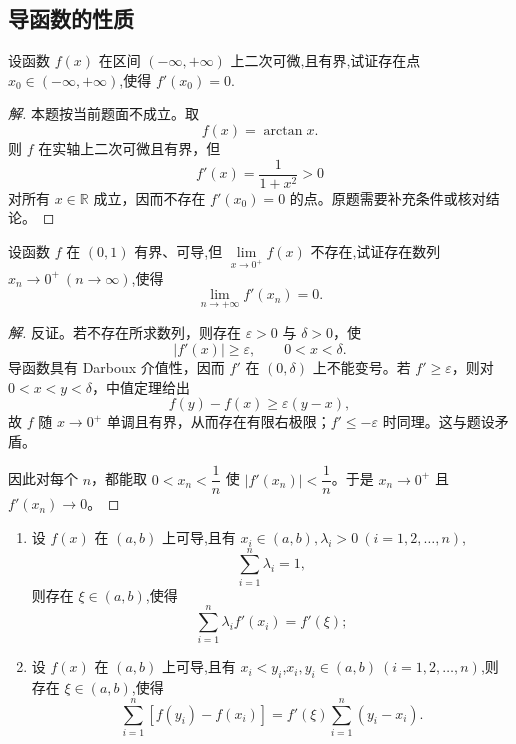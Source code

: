 \documentclass[../../数学分析培优讲义(答案版).tex]{subfiles}
\begin{document}
\subsection{导函数的性质}

\begin{example}
设函数 $f(x)$ 在区间 $(-\infty,+\infty)$ 上二次可微,且有界,试证存在点 $x_0\in(-\infty,+\infty)$,使得 $f'(x_0)=0$.
\end{example}

\begin{proof}[解]
本题按当前题面不成立。取
\[
    f(x)=\arctan x.
\]
则 $f$ 在实轴上二次可微且有界，但
\[
    f'(x)=\dfrac{1}{1+x^2}>0
\]
对所有 $x\in\mathbb{R}$ 成立，因而不存在 $f'(x_0)=0$ 的点。原题需要补充条件或核对结论。
\end{proof}

\begin{example}
设函数 $f$ 在 $(0,1)$ 有界、可导,但 $\displaystyle\lim\limits_{x\to0^+}f(x)$ 不存在,试证存在数列 $x_n\to0^+\ (n\to\infty)$,使得
\[
    \lim\limits_{n\to+\infty}f'(x_n)=0.
\]
\end{example}

\begin{proof}[解]
反证。若不存在所求数列，则存在 $\varepsilon>0$ 与 $\delta>0$，使
\[
    |f'(x)|\geq\varepsilon,
    \qquad 0<x<\delta.
\]
导函数具有 Darboux 介值性，因而 $f'$ 在 $(0,\delta)$ 上不能变号。若 $f'\geq\varepsilon$，则对 $0<x<y<\delta$，中值定理给出
\[
    f(y)-f(x)\geq\varepsilon(y-x),
\]
故 $f$ 随 $x\to0^+$ 单调且有界，从而存在有限右极限；$f'\leq-\varepsilon$ 时同理。这与题设矛盾。

因此对每个 $n$，都能取 $0<x_n<\dfrac{1}{n}$ 使 $|f'(x_n)|<\dfrac{1}{n}$。于是 $x_n\to0^+$ 且 $f'(x_n)\to0$。
\end{proof}

\begin{example}
\begin{enumerate}[label=(\arabic*)]
    \item 设 $f(x)$ 在 $(a,b)$ 上可导,且有 $x_i\in(a,b),\lambda_i>0\ (i=1,2,\ldots,n)$,
    \[
        \sum\limits_{i=1}^n\lambda_i=1,
    \]
    则存在 $\xi\in(a,b)$,使得
    \[
        \sum\limits_{i=1}^n\lambda_i f'(x_i)=f'(\xi);
    \]
    \item 设 $f(x)$ 在 $(a,b)$ 上可导,且有 $x_i<y_i$,$x_i,y_i\in(a,b)\ (i=1,2,\ldots,n)$,则存在 $\xi\in(a,b)$,使得
    \[
        \sum\limits_{i=1}^n[f(y_i)-f(x_i)]
        =f'(\xi)\sum\limits_{i=1}^n(y_i-x_i).
    \]
\end{enumerate}
\end{example}
\end{document}
